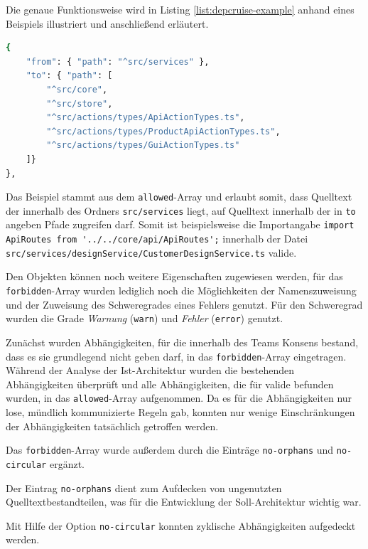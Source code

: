 Die genaue Funktionsweise wird in Listing \ref{list:depcruise-example} anhand eines Beispiels illustriert und anschließend erläutert.
\begin{lstlisting}[language={sh}, label=list:depcruise-example, caption=Beispiel einer Abhängigkeitesrelation]
{
    "from": { "path": "^src/services" },
    "to": { "path": [
        "^src/core",
        "^src/store",
        "^src/actions/types/ApiActionTypes.ts",
        "^src/actions/types/ProductApiActionTypes.ts",
        "^src/actions/types/GuiActionTypes.ts"
    ]}
},
\end{lstlisting}
Das Beispiel stammt aus dem \lstinline|allowed|-Array und erlaubt somit, dass Quelltext der innerhalb des Ordners \lstinline|src/services| liegt, auf Quelltext innerhalb der in \lstinline|to| angeben Pfade zugreifen darf. 
Somit ist beispielsweise die Importangabe \newline  
\glqq\lstinline|import ApiRoutes from '../../core/api/ApiRoutes';|\grqq \newline
innerhalb der Datei \lstinline|src/services/designService/CustomerDesignService.ts| valide.

Den Objekten können noch weitere Eigenschaften zugewiesen werden, für das \lstinline|forbidden|-Array wurden lediglich noch die Möglichkeiten der Namenszuweisung und der Zuweisung des Schweregrades eines Fehlers genutzt. Für den Schweregrad wurden die Grade \emph{Warnung} (\lstinline|warn|) und \emph{Fehler} (\lstinline|error|) genutzt.

Zunächst wurden Abhängigkeiten, für die innerhalb des Teams Konsens bestand, dass es sie grundlegend nicht geben darf, in das \lstinline|forbidden|-Array eingetragen. Während der Analyse der Ist-Architektur wurden die bestehenden Abhängigkeiten überprüft und alle Abhängigkeiten, die für valide befunden wurden, in das \lstinline|allowed|-Array aufgenommen. Da es für die Abhängigkeiten nur lose, mündlich kommunizierte Regeln gab, konnten nur wenige Einschränkungen der Abhängigkeiten tatsächlich getroffen werden.  

Das \lstinline|forbidden|-Array wurde außerdem durch die Einträge 
\lstinline|no-orphans| und \lstinline|no-circular| ergänzt.

Der Eintrag \lstinline|no-orphans| dient zum Aufdecken von ungenutzten Quelltextbestandteilen, was für die Entwicklung der Soll-Architektur wichtig war.

Mit Hilfe der Option \lstinline|no-circular| konnten zyklische Abhängigkeiten aufgedeckt werden.

